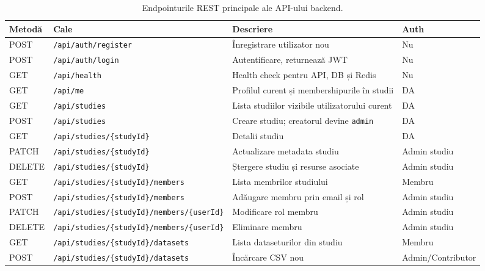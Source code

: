 \begin{table}[t]
\centering
\caption[Endpointurile REST ale API-ului]{Endpointurile REST principale ale API-ului backend.}
\label{tab:endpoints}
\scriptsize
\renewcommand{\arraystretch}{1.08}
\begin{tabularx}{\textwidth}{llXl}
\toprule
\textbf{Metodă} & \textbf{Cale} & \textbf{Descriere} & \textbf{Auth} \\
\midrule
POST   & \texttt{/api/auth/register}            & Înregistrare utilizator nou              & Nu  \\
POST   & \texttt{/api/auth/login}               & Autentificare, returnează JWT            & Nu  \\
GET    & \texttt{/api/health}                   & Health check pentru API, DB și Redis     & Nu  \\
\midrule
GET    & \texttt{/api/me}                       & Profilul curent și membershipurile în studii & DA \\
GET    & \texttt{/api/studies}                  & Lista studiilor vizibile utilizatorului curent & DA \\
POST   & \texttt{/api/studies}                  & Creare studiu; creatorul devine \texttt{admin} & DA \\
GET    & \texttt{/api/studies/\{studyId\}}      & Detalii studiu                           & DA \\
PATCH  & \texttt{/api/studies/\{studyId\}}      & Actualizare metadata studiu              & Admin studiu \\
DELETE & \texttt{/api/studies/\{studyId\}}      & Ștergere studiu și resurse asociate      & Admin studiu \\
\midrule
GET    & \texttt{/api/studies/\{studyId\}/members} & Lista membrilor studiului             & Membru \\
POST   & \texttt{/api/studies/\{studyId\}/members} & Adăugare membru prin email și rol     & Admin studiu \\
PATCH  & \texttt{/api/studies/\{studyId\}/members/\{userId\}} & Modificare rol membru      & Admin studiu \\
DELETE & \texttt{/api/studies/\{studyId\}/members/\{userId\}} & Eliminare membru           & Admin studiu \\
\midrule
GET    & \texttt{/api/studies/\{studyId\}/datasets} & Lista dataseturilor din studiu       & Membru \\
POST   & \texttt{/api/studies/\{studyId\}/datasets} & Încărcare CSV nou                    & Admin/Contributor \\

\end{tabularx}
\end{table}
